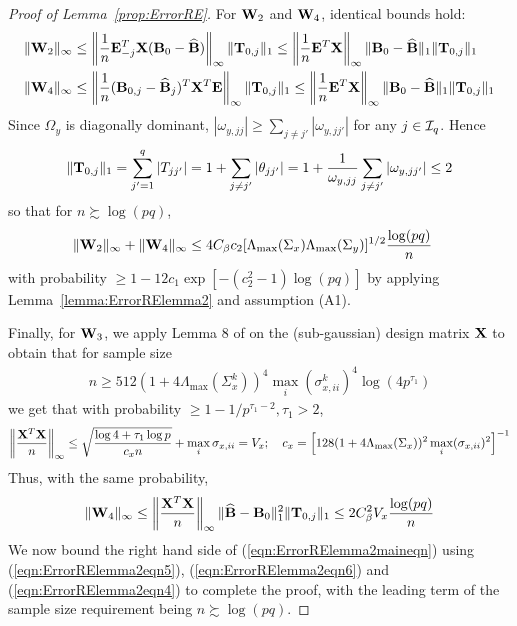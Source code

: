 \begin{proof}[Proof of Lemma~\ref{prop:ErrorRE}]
For ${\mathbf{W}}_2$ and ${\mathbf{W}}_4$, identical bounds hold:
%
\begin{align*}
\| {\mathbf{W}}_2 \|_\infty & \leq \left\| \frac{1}{n} {\mathbf{E}}_{-j}^T {\mathbf{X}} ({\mathbf{B}}_0 - \widehat {{\mathbf{B}}}) \right\|_\infty \| {\mathbf{T}}_{0,j} \|_1 \leq
\left\| \frac{1}{n} {\mathbf{E}}^T {\mathbf{X}} \right\|_\infty \| {\mathbf{B}}_0 - \widehat {{\mathbf{B}}} \|_1 \| {\mathbf{T}}_{0,j} \|_1\\
\| {\mathbf{W}}_4 \|_\infty & \leq \left\| \frac{1}{n} ({\mathbf{B}}_{0,j} - \widehat {{\mathbf{B}}}_j)^T {\mathbf{X}}^T {\mathbf{E}} \right\|_\infty \| {\mathbf{T}}_{0,j} \|_1 \leq
\left\| \frac{1}{n} {\mathbf{E}}^T {\mathbf{X}} \right\|_\infty \| {\mathbf{B}}_0 - \widehat {{\mathbf{B}}} \|_1 \| {\mathbf{T}}_{0,j} \|_1\\
\end{align*}
%
Since $\Omega_y$ is diagonally dominant, $|\omega_{y,jj}| \geq \sum_{j \neq j'} |\omega_{y,jj'}|$ for any $j \in {\cal{I}}_q$. Hence
%
$$
\| {\mathbf{T}}_{0,j} \|_1 = \sum_{j'=1}^q | T_{jj'} | = 1 + \sum_{j \neq j'} | \theta_{jj'} | = 1 + \frac{1}{\omega_{y,jj}} \sum_{j \neq j'} | \omega_{y,jj'} | \leq 2
$$
%
so that for $n \succsim \log (pq)$,
%
\begin{align}\label{eqn:ErrorRElemma2eqn6}
\| {\mathbf{W}}_2 \|_\infty + \| {\mathbf{W}}_4 \|_\infty  & \leq
4 C_\beta c_2 [ \Lambda_{\max} (\Sigma_x) \Lambda_{\max} (\Sigma_y) ]^{1/2} \frac{ \log(pq)}{n}
\end{align}
%
with probability $\geq 1 - 12 c_1 \exp [-(c_2^2-1) \log(pq)]$ by applying Lemma~\ref{lemma:ErrorRElemma2} and assumption (A1).

Finally, for ${\mathbf{W}}_3$, we apply Lemma 8 of \cite{RavikumarEtal11} on the (sub-gaussian) design matrix ${\mathbf{X}}$ to obtain that for sample size
%
\begin{align}\label{eqn:ErrorRElemma2eqn7}
n \geq 512 ( 1 + 4 \Lambda_{\max} (\Sigma_x^k))^4 \max_i (\sigma_{x,ii}^k )^4 \log (4p^{\tau_1})
\end{align}
%
we get that with probability $ \geq 1 - 1/p^{\tau_1-2}, \tau_1 > 2$,
%
$$
\left\| \frac{{\mathbf{X}}^T {\mathbf{X}}}{n} \right\|_\infty \leq \sqrt{ \frac{ \log 4 + \tau_1 \log p}{c_x n}} + \max_i \sigma_{x,ii} = V_x; \quad
c_x = \left[ 128 ( 1 + 4 \Lambda_{\max} (\Sigma_x)  )^2 \max_i (\sigma_{x,ii})^2 \right]^{-1}
$$
%
Thus, with the same probability,
%
\begin{align}\label{eqn:ErrorRElemma2eqn4}
\| {\mathbf{W}}_4 \|_\infty \leq \left\| \frac{{\mathbf{X}}^T {\mathbf{X}}}{n} \right\|_\infty \| \widehat {{\mathbf{B}}} - {\mathbf{B}}_0 \|_1^2 \| {\mathbf{T}}_{0,j} \|_1 
\leq 2 C_\beta^2 V_x \frac{ \log(pq)}{n}
\end{align}
%
We now bound the right hand side of (\ref{eqn:ErrorRElemma2maineqn}) using (\ref{eqn:ErrorRElemma2eqn5}), (\ref{eqn:ErrorRElemma2eqn6}) and (\ref{eqn:ErrorRElemma2eqn4}) to complete the proof, with the leading term of the sample size requirement being $n \succsim \log(pq)$.
\end{proof}

